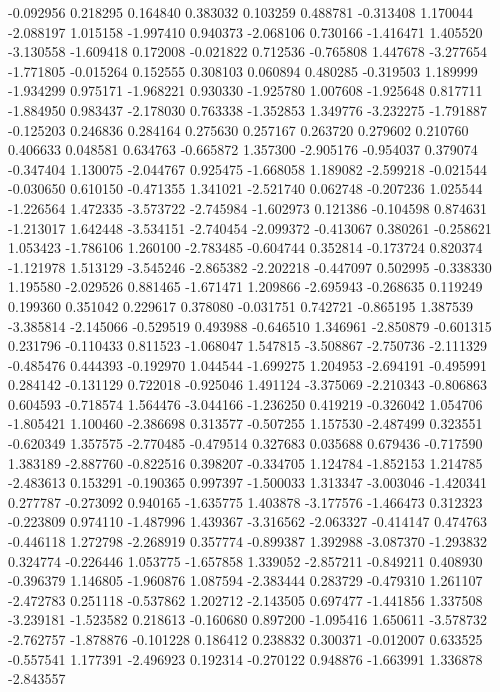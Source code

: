 -0.092956
0.218295
0.164840
0.383032
0.103259
0.488781
-0.313408
1.170044
-2.088197
1.015158
-1.997410
0.940373
-2.068106
0.730166
-1.416471
1.405520
-3.130558
-1.609418
0.172008
-0.021822
0.712536
-0.765808
1.447678
-3.277654
-1.771805
-0.015264
0.152555
0.308103
0.060894
0.480285
-0.319503
1.189999
-1.934299
0.975171
-1.968221
0.930330
-1.925780
1.007608
-1.925648
0.817711
-1.884950
0.983437
-2.178030
0.763338
-1.352853
1.349776
-3.232275
-1.791887
-0.125203
0.246836
0.284164
0.275630
0.257167
0.263720
0.279602
0.210760
0.406633
0.048581
0.634763
-0.665872
1.357300
-2.905176
-0.954037
0.379074
-0.347404
1.130075
-2.044767
0.925475
-1.668058
1.189082
-2.599218
-0.021544
-0.030650
0.610150
-0.471355
1.341021
-2.521740
0.062748
-0.207236
1.025544
-1.226564
1.472335
-3.573722
-2.745984
-1.602973
0.121386
-0.104598
0.874631
-1.213017
1.642448
-3.534151
-2.740454
-2.099372
-0.413067
0.380261
-0.258621
1.053423
-1.786106
1.260100
-2.783485
-0.604744
0.352814
-0.173724
0.820374
-1.121978
1.513129
-3.545246
-2.865382
-2.202218
-0.447097
0.502995
-0.338330
1.195580
-2.029526
0.881465
-1.671471
1.209866
-2.695943
-0.268635
0.119249
0.199360
0.351042
0.229617
0.378080
-0.031751
0.742721
-0.865195
1.387539
-3.385814
-2.145066
-0.529519
0.493988
-0.646510
1.346961
-2.850879
-0.601315
0.231796
-0.110433
0.811523
-1.068047
1.547815
-3.508867
-2.750736
-2.111329
-0.485476
0.444393
-0.192970
1.044544
-1.699275
1.204953
-2.694191
-0.495991
0.284142
-0.131129
0.722018
-0.925046
1.491124
-3.375069
-2.210343
-0.806863
0.604593
-0.718574
1.564476
-3.044166
-1.236250
0.419219
-0.326042
1.054706
-1.805421
1.100460
-2.386698
0.313577
-0.507255
1.157530
-2.487499
0.323551
-0.620349
1.357575
-2.770485
-0.479514
0.327683
0.035688
0.679436
-0.717590
1.383189
-2.887760
-0.822516
0.398207
-0.334705
1.124784
-1.852153
1.214785
-2.483613
0.153291
-0.190365
0.997397
-1.500033
1.313347
-3.003046
-1.420341
0.277787
-0.273092
0.940165
-1.635775
1.403878
-3.177576
-1.466473
0.312323
-0.223809
0.974110
-1.487996
1.439367
-3.316562
-2.063327
-0.414147
0.474763
-0.446118
1.272798
-2.268919
0.357774
-0.899387
1.392988
-3.087370
-1.293832
0.324774
-0.226446
1.053775
-1.657858
1.339052
-2.857211
-0.849211
0.408930
-0.396379
1.146805
-1.960876
1.087594
-2.383444
0.283729
-0.479310
1.261107
-2.472783
0.251118
-0.537862
1.202712
-2.143505
0.697477
-1.441856
1.337508
-3.239181
-1.523582
0.218613
-0.160680
0.897200
-1.095416
1.650611
-3.578732
-2.762757
-1.878876
-0.101228
0.186412
0.238832
0.300371
-0.012007
0.633525
-0.557541
1.177391
-2.496923
0.192314
-0.270122
0.948876
-1.663991
1.336878
-2.843557
